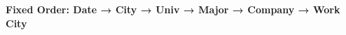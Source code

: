 \documentclass[preview]{standalone}
\begin{document}
\begin{center}
\textbf{Fixed Order: Date → City → Univ → Major → Company → Work City}
\end{center}
\end{document}
